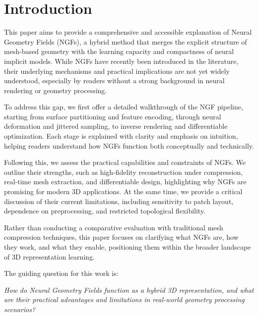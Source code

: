 \section{Introduction}
This paper aims to provide a comprehensive and accessible explanation of Neural Geometry Fields (NGFs), a hybrid method that merges the explicit structure of mesh-based geometry with the learning capacity and compactness of neural implicit models. 
While NGFs have recently been introduced in the literature, their underlying mechanisms and practical implications are not yet widely understood, especially by readers without a strong background in neural rendering or geometry processing. 

To address this gap, we first offer a detailed walkthrough of the NGF pipeline, starting from surface partitioning and feature encoding, through neural deformation and jittered sampling, to inverse rendering and differentiable optimization. 
Each stage is explained with clarity and emphasis on intuition, helping readers understand how NGFs function both conceptually and technically. 

Following this, we assess the practical capabilities and constraints of NGFs. 
We outline their strengths, such as high-fidelity reconstruction under compression, real-time mesh extraction, and differentiable design, highlighting why NGFs are promising for modern 3D applications. 
At the same time, we provide a critical discussion of their current limitations, including sensitivity to patch layout, dependence on preprocessing, and restricted topological flexibility. 

Rather than conducting a comparative evaluation with traditional mesh compression techniques, this paper focuses on clarifying what NGFs are, how they work, and what they enable, positioning them within the broader landscape of 3D representation learning. 

The guiding question for this work is: 

\textit{How do Neural Geometry Fields function as a hybrid 3D representation, and what are their practical advantages and limitations in real-world geometry processing scenarios?}